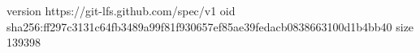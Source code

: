 version https://git-lfs.github.com/spec/v1
oid sha256:ff297c3131c64fb3489a99f81f930657ef85ae39fedacb0838663100d1b4bb40
size 139398
